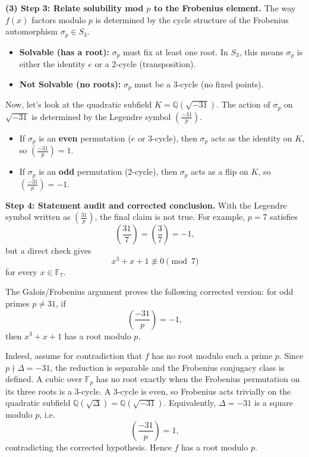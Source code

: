 \begin{solution}
\textbf{(3) Step 3: Relate solubility mod $p$ to the Frobenius element.}
The way $f(x)$ factors modulo $p$ is determined by the cycle structure of the Frobenius automorphism $\sigma_p \in S_3$.
\begin{itemize}
    \item \textbf{Solvable (has a root):} $\sigma_p$ must fix at least one root. In $S_3$, this means $\sigma_p$ is either the identity $e$ or a 2-cycle (transposition).
    \item \textbf{Not Solvable (no roots):} $\sigma_p$ must be a 3-cycle (no fixed points).
\end{itemize}
Now, let's look at the quadratic subfield $K = \mathbb{Q}(\sqrt{-31})$. The action of $\sigma_p$ on $\sqrt{-31}$ is determined by the Legendre symbol $\left(\frac{-31}{p}\right)$.
\begin{itemize}
    \item If $\sigma_p$ is an \textbf{even} permutation ($e$ or 3-cycle), then $\sigma_p$ acts as the identity on $K$, so $\left(\frac{-31}{p}\right) = 1$.
    \item If $\sigma_p$ is an \textbf{odd} permutation (2-cycle), then $\sigma_p$ acts as a flip on $K$, so $\left(\frac{-31}{p}\right) = -1$.
\end{itemize}

\textbf{Step 4: Statement audit and corrected conclusion.}
With the Legendre symbol written as $\left(\frac{31}{p}\right)$, the final claim is not true. For example, $p=7$ satisfies
\[
\left(\frac{31}{7}\right)=\left(\frac{3}{7}\right)=-1,
\]
but a direct check gives
\[
x^3+x+1\not\equiv 0\pmod 7
\]
for every $x\in \mathbb{F}_7$.

The Galois/Frobenius argument proves the following corrected version: for odd primes $p\neq 31$, if
\[
\left(\frac{-31}{p}\right)=-1,
\]
then $x^3+x+1$ has a root modulo $p$.

Indeed, assume for contradiction that $f$ has no root modulo such a prime $p$. Since $p\nmid \Delta=-31$, the reduction is separable and the Frobenius conjugacy class is defined. A cubic over $\mathbb{F}_p$ has no root exactly when the Frobenius permutation on its three roots is a 3-cycle. A 3-cycle is even, so Frobenius acts trivially on the quadratic subfield $\mathbb{Q}(\sqrt{\Delta})=\mathbb{Q}(\sqrt{-31})$. Equivalently, $\Delta=-31$ is a square modulo $p$, i.e.
\[
\left(\frac{-31}{p}\right)=1,
\]
contradicting the corrected hypothesis. Hence $f$ has a root modulo $p$.
\end{solution}

